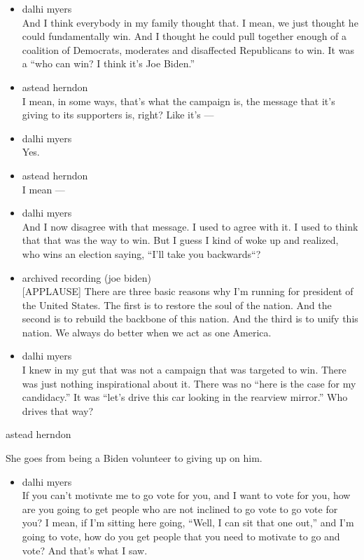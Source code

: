 \begin{itemize}
\item
  dalhi myers\\
  And I think everybody in my family thought that. I mean, we just
  thought he could fundamentally win. And I thought he could pull
  together enough of a coalition of Democrats, moderates and disaffected
  Republicans to win. It was a ``who can win? I think it's Joe Biden.''
\item
  astead herndon\\
  I mean, in some ways, that's what the campaign is, the message that
  it's giving to its supporters is, right? Like it's ---
\item
  dalhi myers\\
  Yes.
\item
  astead herndon\\
  I mean ---
\item
  dalhi myers\\
  And I now disagree with that message. I used to agree with it. I used
  to think that that was the way to win. But I guess I kind of woke up
  and realized, who wins an election saying, ``I'll take you
  backwards``?
\item
  archived recording (joe biden)\\
  {[}APPLAUSE{]} There are three basic reasons why I'm running for
  president of the United States. The first is to restore the soul of
  the nation. And the second is to rebuild the backbone of this nation.
  And the third is to unify this nation. We always do better when we act
  as one America.
\item
  dalhi myers\\
  I knew in my gut that was not a campaign that was targeted to win.
  There was just nothing inspirational about it. There was no ``here is
  the case for my candidacy.'' It was ``let's drive this car looking in
  the rearview mirror.'' Who drives that way?
\end{itemize}

astead herndon

She goes from being a Biden volunteer to giving up on him.

\begin{itemize}
\tightlist
\item
  dalhi myers\\
  If you can't motivate me to go vote for you, and I want to vote for
  you, how are you going to get people who are not inclined to go vote
  to go vote for you? I mean, if I'm sitting here going, ``Well, I can
  sit that one out,'' and I'm going to vote, how do you get people that
  you need to motivate to go and vote? And that's what I saw.
\end{itemize}

